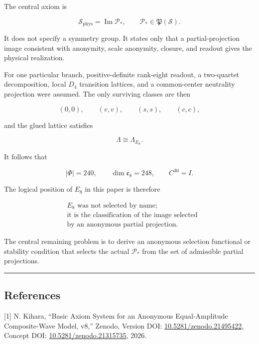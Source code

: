 \documentclass[
  a4paper,
]{article}
\begin{document}
The central axiom is

\[
\boxed{
\mathscr S_{\mathrm{phys}}
=
\operatorname{Im}\mathcal P_*,
\qquad
\mathcal P_*
\in
\mathfrak P(\mathscr S).
}
\]

It does not specify a symmetry group. It states only that a
partial-projection image consistent with anonymity, scale anonymity,
closure, and readout gives the physical realization.

For one particular branch, positive-definite rank-eight readout, a
two-quartet decomposition, local \(D_4\) transition lattices, and a
common-center neutrality projection were assumed. The only surviving
classes are then

\[
\boxed{
(0,0),
\qquad
(v,v),
\qquad
(s,s),
\qquad
(c,c),
}
\]

and the glued lattice satisfies

\[
\boxed{
\Lambda
\cong
\Lambda_{E_8}.
}
\]

It follows that

\[
\boxed{
|\Phi|
=240,
\qquad
\dim\mathfrak e_8
=248,
\qquad
C^{30}
=I.
}
\]

The logical position of \(E_8\) in this paper is therefore

\[
\boxed{
\begin{aligned}
&\text{$E_8$ was not selected by name;}\\
&\text{it is the classification of the image selected}\\
&\text{by an anonymous partial projection.}
\end{aligned}
}
\]

The central remaining problem is to derive an anonymous selection
functional or stability condition that selects the actual
\(\mathcal P_*\) from the set of admissible partial projections.

\begin{center}\rule{0.5\linewidth}{0.5pt}\end{center}

\subsection{References}\label{references}

{[}1{]} N. Kihara, ``Basic Axiom System for an Anonymous Equal-Amplitude
Composite-Wave Model, v8,'' Zenodo, Version DOI:
\href{https://doi.org/10.5281/zenodo.21495422}{10.5281/zenodo.21495422},
Concept DOI:
\href{https://doi.org/10.5281/zenodo.21315735}{10.5281/zenodo.21315735},
2026.
\end{document}
